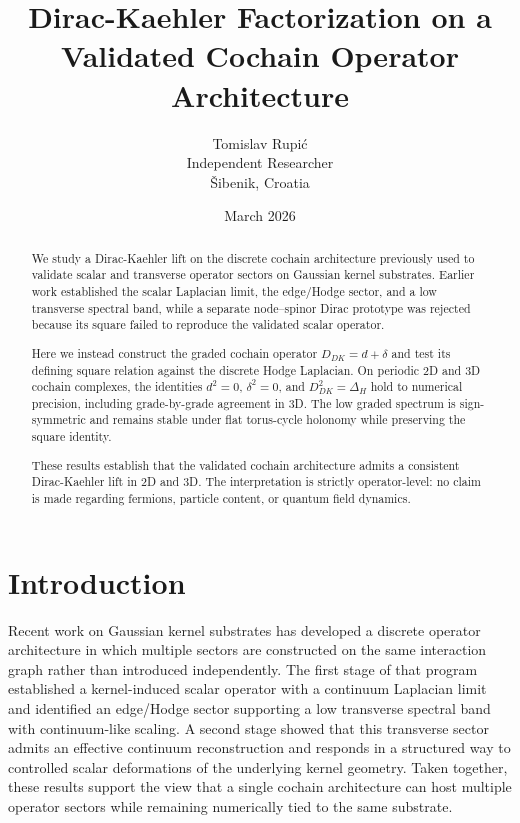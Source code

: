 \documentclass[11pt]{article}
\title{Dirac-Kaehler Factorization on a Validated Cochain Operator Architecture}
\author{Tomislav Rupi\'c\\Independent Researcher\\\v{S}ibenik, Croatia}
\date{March 2026}
\begin{document}
\maketitle

\begin{abstract}
We study a Dirac-Kaehler lift on the discrete cochain architecture previously used to validate scalar and transverse operator sectors on Gaussian kernel substrates. Earlier work established the scalar Laplacian limit, the edge/Hodge sector, and a low transverse spectral band, while a separate node--spinor Dirac prototype was rejected because its square failed to reproduce the validated scalar operator.

Here we instead construct the graded cochain operator $D_{DK} = d + \delta$ and test its defining square relation against the discrete Hodge Laplacian. On periodic 2D and 3D cochain complexes, the identities $d^2 = 0$, $\delta^2 = 0$, and $D_{DK}^2 = \Delta_H$ hold to numerical precision, including grade-by-grade agreement in 3D. The low graded spectrum is sign-symmetric and remains stable under flat torus-cycle holonomy while preserving the square identity.

These results establish that the validated cochain architecture admits a consistent Dirac-Kaehler lift in 2D and 3D. The interpretation is strictly operator-level: no claim is made regarding fermions, particle content, or quantum field dynamics.
\end{abstract}

\section{Introduction}

Recent work on Gaussian kernel substrates has developed a discrete operator architecture in which multiple sectors are constructed on the same interaction graph rather than introduced independently. The first stage of that program established a kernel-induced scalar operator with a continuum Laplacian limit and identified an edge/Hodge sector supporting a low transverse spectral band with continuum-like scaling. A second stage showed that this transverse sector admits an effective continuum reconstruction and responds in a structured way to controlled scalar deformations of the underlying kernel geometry. Taken together, these results support the view that a single cochain architecture can host multiple operator sectors while remaining numerically tied to the same substrate.
\end{document}
